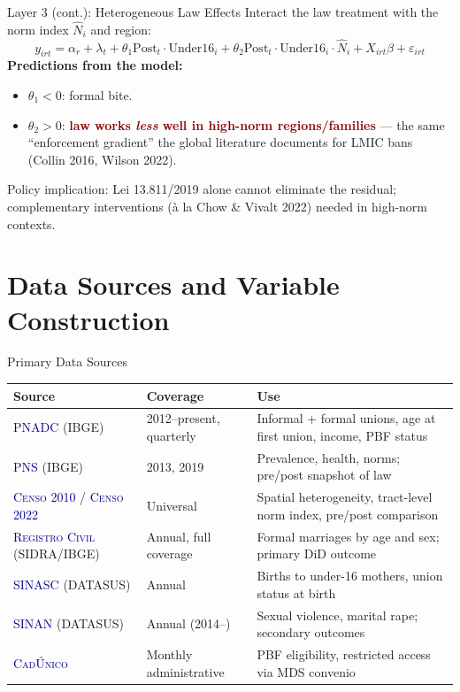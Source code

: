 \documentclass[aspectratio=169,10pt]{beamer}
\newcommand{\onecite}[1]{\textcolor{darkblue}{\textsc{#1}}}
\newcommand{\hl}[1]{\textcolor{darkred}{\textbf{#1}}}
\begin{document}
\begin{frame}{Layer 3 (cont.): Heterogeneous Law Effects}
    Interact the law treatment with the norm index $\widehat{N}_i$ and region:
    \[
        y_{irt} = \alpha_r + \lambda_t + \theta_1 \text{Post}_t \cdot \text{Under16}_i + \theta_2 \text{Post}_t \cdot \text{Under16}_i \cdot \widehat{N}_i + X_{irt}\beta + \varepsilon_{irt}
    \]
    \textbf{Predictions from the model:}
    \begin{itemize}
        \item $\theta_1 < 0$: formal bite.
        \item $\theta_2 > 0$: \hl{law works \emph{less} well in high-norm regions/families} --- the same ``enforcement gradient'' the global literature documents for LMIC bans (Collin 2016, Wilson 2022).
    \end{itemize}

    Policy implication: Lei 13.811/2019 alone cannot eliminate the residual; complementary interventions (\`a la Chow \& Vivalt 2022) needed in high-norm contexts.
\end{frame}

\section{Data Sources and Variable Construction}

\begin{frame}{Primary Data Sources}
    \small
    \begin{tabular}{p{3cm} p{3cm} p{7cm}}
        \toprule
        \textbf{Source} & \textbf{Coverage} & \textbf{Use} \\
        \midrule
        \onecite{PNADC} (IBGE) & 2012--present, quarterly & Informal + formal unions, age at first union, income, PBF status \\
        \onecite{PNS} (IBGE) & 2013, 2019 & Prevalence, health, norms; pre/post snapshot of law \\
        \onecite{Censo 2010} / \onecite{Censo 2022} & Universal & Spatial heterogeneity, tract-level norm index, pre/post comparison \\
        \onecite{Registro Civil} (SIDRA/IBGE) & Annual, full coverage & Formal marriages by age and sex; primary DiD outcome \\
        \onecite{SINASC} (DATASUS) & Annual & Births to under-16 mothers, union status at birth \\
        \onecite{SINAN} (DATASUS) & Annual (2014--) & Sexual violence, marital rape; secondary outcomes \\
        \onecite{CadÚnico} & Monthly administrative & PBF eligibility, restricted access via MDS convenio \\
        \bottomrule
    \end{tabular}
\end{frame}
\end{document}

